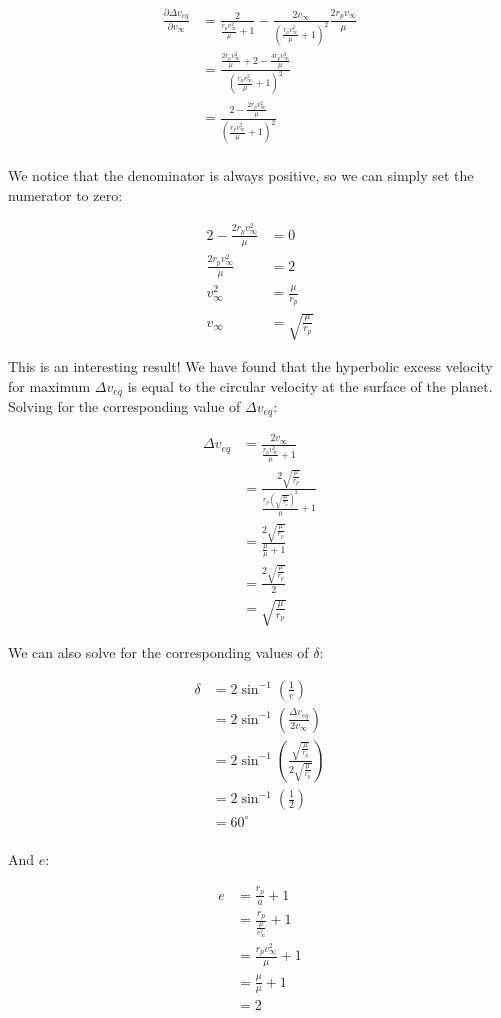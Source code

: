 \begin{align*}
    \frac{\partial \Delta v_{eq}}{\partial v_\infty} &= \frac{2}{\frac{r_p v_\infty^2}{\mu} + 1} - \frac{2 v_\infty}{\left( \frac{r_p v_\infty^2}{\mu} + 1 \right)^2} \frac{2 r_p v_\infty}{\mu} \\
    &= \frac{\frac{2r_p v_\infty^2}{\mu} + 2 - \frac{4r_p v_\infty^2}{\mu}}{\left( \frac{r_p v_\infty^2}{\mu} + 1 \right)^2} \\
    &= \frac{2 - \frac{2r_p v_\infty^2}{\mu}}{\left( \frac{r_p v_\infty^2}{\mu} + 1 \right)^2} \\
\end{align*}

We notice that the denominator is always positive, so we can simply set the numerator to zero:

\begin{align*}
    2 - \frac{2r_p v_\infty^2}{\mu} &= 0 \\
    \frac{2r_p v_\infty^2}{\mu} &= 2 \\
    v_\infty^2 &= \frac{\mu}{r_p} \\
    v_\infty &= \sqrt{\frac{\mu}{r_p}}
\end{align*}

This is an interesting result! We have found that the hyperbolic excess velocity for maximum $\Delta v_{eq}$ is equal to the circular velocity at the surface of the planet. Solving for the corresponding value of $\Delta v_{eq}$:

\begin{align*}
    \Delta v_{eq} &= \frac{2 v_\infty}{\frac{r_p v_\infty^2}{\mu} + 1} \\
    &= \frac{2 \sqrt{\frac{\mu}{r_p}}}{\frac{r_p \left( \sqrt{\frac{\mu}{r_p}} \right)^2}{\mu} + 1} \\
    &= \frac{2 \sqrt{\frac{\mu}{r_p}}}{\frac{\mu}{\mu} + 1} \\
    &= \frac{2 \sqrt{\frac{\mu}{r_p}}}{2} \\
    &= \sqrt{\frac{\mu}{r_p}}
\end{align*}

We can also solve for the corresponding values of $\delta$:

\begin{align*}
    \delta &= 2 \sin^{-1} \left( \frac{1}{e} \right) \\
    &= 2 \sin^{-1} \left( \frac{\Delta v_{eq}}{2 v_\infty} \right) \\
    &= 2 \sin^{-1} \left( \frac{\sqrt{\frac{\mu}{r_p}}}{2 \sqrt{\frac{\mu}{r_p}}} \right) \\
    &= 2 \sin^{-1} \left( \frac{1}{2} \right) \\
    &= 60^\circ \\
\end{align*}

And $e$:

\begin{align*}
    e &= \frac{r_p}{a} + 1 \\
    &= \frac{r_p}{\frac{\mu}{v_\infty^2}} + 1 \\
    &= \frac{r_p v_\infty^2}{\mu} + 1 \\
    &= \frac{\mu}{\mu} + 1 \\
    &= 2
\end{align*}


